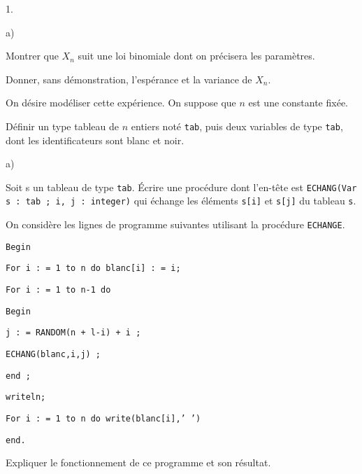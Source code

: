 \documentclass[11pt]{article}%
\begin{document}
\begin{noliste}{1.}
 \setlength{\itemsep}{4mm}
\item 
\begin{noliste}{a)}
 \setlength{\itemsep}{2mm}
\item Montrer que $X_{n}$ suit une loi binomiale dont on précisera les
paramètres.

\item Donner, sans démonstration, l'espérance et la variance de
$X_{n}$.
\end{noliste}

\hspace{-1cm}On désire modéliser cette expérience. On suppose
que $n$ est une constante fixée.

\item Définir un type tableau de $n$ entiers noté \texttt{tab}, puis
deux variables de type \texttt{tab}, dont les identificateurs sont
blanc et
noir.

\item 
\begin{noliste}{a)}
 \setlength{\itemsep}{2mm}
\item Soit s un tableau de type \texttt{tab}. Écrire une procédure
dont l'en-tête est \texttt{ECHANG\E(Var s : tab ; i, j : integer)} qui 
échange les éléments \texttt{s[i]} et \texttt{s[j]} du tableau 
\texttt{s}.

\item On considère les lignes de programme suivantes utilisant la
procédure \texttt{ECHANGE}.

\texttt{Begin}

\texttt{For i : = 1 to n do blanc[i] : = i; }

\texttt{For i : = 1 to n-1 do}

\texttt{\hspace{1cm}Begin}

\texttt{\hspace{1cm}j : = RANDOM(n + l-i) + i ; }

\texttt{\hspace{1cm}ECHANG\E(blanc,i,j) ; }

\texttt{\hspace{1cm}end ;}

\texttt{writeln;}

\texttt{For i : = 1 to n do write(blanc[i],' ') }

\texttt{end.}

Expliquer le fonctionnement de ce programme et son résultat.


\end{noliste}
\end{noliste}
\end{document}
